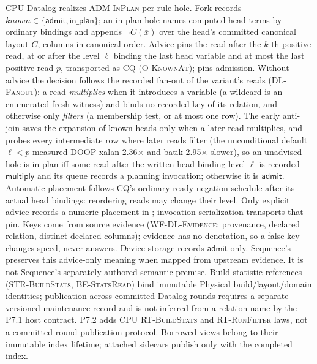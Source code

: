 CPU Datalog realizes \textsc{ADM-InPlan} per rule hole. Fork records
$\mathit{known}\in\{\mathsf{admit},\mathsf{in\_plan}\}$; an in-plan hole
names computed head terms by ordinary bindings and appends $\neg C(\bar x)$
over the head's committed canonical layout $C$, columns in canonical order.
Advice  pins the read after the $k$-th positive
read, at or after the level $\ell$ binding the last head variable and at most
the last positive read $p$, transported as CQ 
(\textsc{O-KnownAt});  pins admission. Without advice the
decision follows the recorded fan-out of the variant's reads
(\textsc{DL-Fanout}): a read \emph{multiplies} when it introduces a variable
(a wildcard is an enumerated fresh witness) and binds no recorded key of its
relation, and otherwise only \emph{filters} (a membership test, or at most one
row). The early anti-join saves the expansion of known heads only when a later
read multiplies, and probes every intermediate row where later reads filter
(the unconditional default $\ell<p$ measured DOOP xalan 
2.36$\times$ and batik  2.95$\times$ slower), so an unadvised
hole is in plan iff some read after the written head-binding level $\ell$ is
recorded $\mathsf{multiply}$ and its queue records a planning invocation;
otherwise it is $\mathsf{admit}$. Automatic placement follows CQ's ordinary
ready-negation schedule after its actual head bindings: reordering reads may
change their level. Only explicit advice records a numeric placement in
; invocation serialization transports that pin.
Keys come from source evidence
(\textsc{WF-DL-Evidence}: provenance, declared relation, distinct declared
columns); evidence has no denotation, so a false key changes speed, never
answers. Device storage records $\mathsf{admit}$ only.
Sequence's  preserves this advice-only meaning when
mapped from upstream evidence. It is not Sequence's separately authored
 semantic premise. Build-statistic references
(\textsc{STR-BuildStats}, \textsc{BE-StatsRead}) bind immutable Physical
build/layout/domain identities; publication across committed Datalog rounds
requires a separate versioned maintenance record and is not inferred from a
relation name by the P7.1 host contract.
P7.2 adds CPU \textsc{RT-BuildStats} and \textsc{RT-RunFilter} laws, not a
committed-round publication protocol. Borrowed views belong to their immutable
index lifetime; attached sidecars publish only with the completed index.
